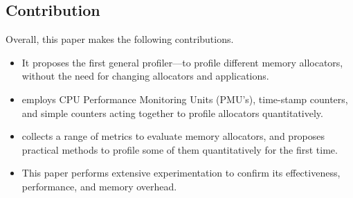 
\subsection*{Contribution}

Overall, this paper makes the following contributions. 

\begin{itemize}
\item It proposes the first general profiler--\MP{}--to profile different memory allocators, without the need for changing allocators and applications.  

\item \MP{} employs CPU Performance Monitoring Units (PMU's), time-stamp counters, and simple counters acting together to profile allocators quantitatively. 

\item \MP{} collects a range of metrics to evaluate memory allocators, and proposes practical methods to profile some of them quantitatively for the first time. 
 
\item This paper performs extensive experimentation to confirm its effectiveness, performance, and memory overhead.    

\end{itemize} 

